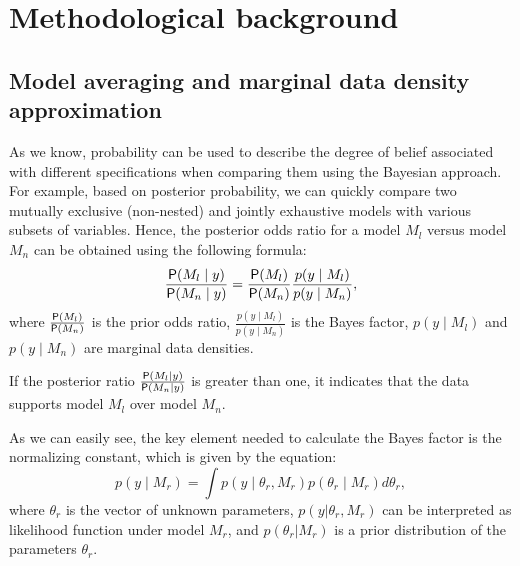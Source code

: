 \section{Methodological background}\label{sec:Method_back}
\subsection{Model averaging and marginal data density approximation}\label{MA_basics}
As we know, probability can be used to describe the degree
of belief associated with different specifications when
comparing them using the Bayesian approach. For example,
based on posterior probability, we can quickly compare two
mutually exclusive (non-nested) and jointly exhaustive models
with various subsets of variables. Hence, the posterior odds
ratio for a model $M_l$ versus model $M_n$ can be obtained
using the following formula:
\begin{equation}
	\frac{\mathsf{P}(M_l \mid y)}{\mathsf{P}(M_n \mid y)}=\frac{\mathsf{P}(M_l)}{\mathsf{P}(M_n)}\frac{p(y \mid M_l)}{p(y \mid M_n)},
	\label{eq:posterior_odds_ratio}
\end{equation}
where $\frac{\mathsf{P}(M_l)}{\mathsf{P}(M_n)}$ is the prior odds ratio,
$\frac{p(y \mid M_l)}{p(y \mid M_n)}$ is the Bayes factor,
$p(y \mid M_l)$ and $p(y \mid M_n)$ are marginal data densities. 

If the posterior ratio $\frac{\mathsf{P}(M_l \mid y)}{\mathsf{P}(M_n \mid y)}$
is greater than one, it indicates that the data supports
model $M_l$ over model $M_n$.

As we can easily see, the key element needed to calculate
the Bayes factor is the normalizing constant, which is given
by the equation:
\begin{equation}
	p(y \mid M_r)=\int p(y \mid \theta_r, M_r)p(\theta_r \mid M_r)d\theta_r,
	\label{eq: p_y}
\end{equation}
where $\theta_r$ is the vector of unknown parameters,
$p(y|\theta_r, M_r)$ can be interpreted as likelihood function
under model $M_r$, and $p(\theta_r|M_r)$ is a prior
distribution of the parameters $\theta_r$.


